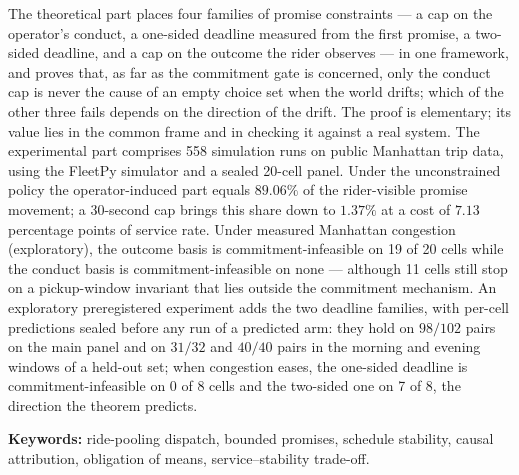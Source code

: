 The theoretical part places four families of promise constraints --- a cap on the operator's
conduct, a one-sided deadline measured from the first promise, a two-sided deadline, and a cap
on the outcome the rider observes --- in one framework, and proves that, as far as the
commitment gate is concerned, only the conduct cap is never the cause of an empty choice set
when the world drifts; which of the other three fails depends on the direction of the drift.
The proof is elementary; its value lies in the common frame and in checking it against a real
system. The experimental part comprises 558 simulation runs on public Manhattan trip data,
using the FleetPy simulator and a sealed 20-cell panel. Under the unconstrained policy the
operator-induced part equals $89.06\%$ of the rider-visible promise movement; a 30-second cap
brings this share down to $1.37\%$ at a cost of $7.13$ percentage points of service rate. Under
measured Manhattan congestion (exploratory), the outcome basis is commitment-infeasible on 19
of 20 cells while the conduct basis is commitment-infeasible on none --- although 11 cells still
stop on a pickup-window invariant that lies outside the commitment mechanism. An exploratory
preregistered experiment adds the two deadline families, with per-cell predictions sealed before
any run of a predicted arm: they hold on $98/102$ pairs on the main panel and on $31/32$ and $40/40$ pairs in the
morning and evening windows of a held-out set; when congestion eases, the one-sided deadline is
commitment-infeasible on 0 of 8 cells and the two-sided one on 7 of 8, the direction the theorem
predicts.

\vspace{6pt}
\noindent\textbf{Keywords:} ride-pooling dispatch, bounded promises, schedule stability, causal
attribution, obligation of means, service--stability trade-off.

\clearpage
